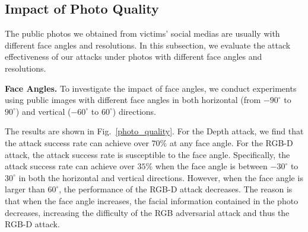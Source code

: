 
\subsection{Impact of Photo Quality}


The public photos we obtained from victims' social medias are usually with different face angles and resolutions. In this subsection, we evaluate the attack effectiveness of our attacks under photos with different face angles and resolutions.


\textbf{Face Angles.}
To investigate the impact of face angles, we conduct experiments using public images with different face angles in both horizontal (from $-90^\circ$ to $90^\circ$) and vertical  ($-60^\circ$ to $60^\circ$) directions. 

The results are shown in Fig.~\ref{photo_quality}. For the Depth attack, we find that the attack success rate can achieve over $70\%$ at any face angle. 
For the RGB-D attack, the attack success rate is susceptible to the face angle. Specifically, the attack success rate can achieve over $35\%$ when the face angle is between $-30^\circ$  to $30^\circ$ in both the horizontal and vertical directions. However, when the face angle is larger than $60^\circ$, the performance of the RGB-D attack decreases.
The reason is that when the face angle increases, the facial information contained in the photo decreases, increasing the difficulty of the RGB adversarial attack and thus the RGB-D attack.

